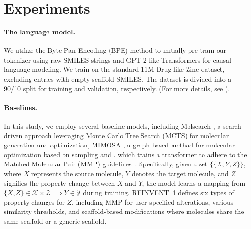 



\section{Experiments}\label{experiments}




{\paragraph{The language model.} 
We utilize the Byte Pair Encoding (BPE) method \citep{gage1994new_bpe, sennrich2015neural_bpe} to initially pre-train our tokenizer using raw SMILES strings and GPT-2-like Transformers for causal language modeling. We train on the standard 11M Drug-like Zinc dataset, excluding entries with empty scaffold SMILES. The dataset is divided into a 90/10 split for training and validation, respectively. (For more details, see ).}



{\paragraph{Baselines.} 
In this study, 
we employ several baseline models, including 
Molsearch \citep{sun2022molsearch}, a search-driven approach leveraging Monte Carlo Tree Search (MCTS) for molecular generation and optimization,  MIMOSA \citep{fu2021mimosa}, a graph-based method for molecular optimization based on sampling and . 
which trains a transformer to adhere to the Matched Molecular Pair (MMP) guidelines~\citep{tyrchan2017matched}.
Specifically, given a set $\{\{X,Y,Z\}\}$, where $X$ represents the source molecule, $Y$ denotes the target molecule, and $Z$ signifies the property change between $X$ and $Y$, the model learns a mapping from $\{X, Z\} \in \ensuremath{\mathcal{X}} \times \ensuremath{\mathcal{Z}} \implies Y \in \ensuremath{\mathcal{Y}}$ during training.
REINVENT~4 defines six types of property changes for $Z$, including MMP for user-specified alterations, various similarity thresholds, and scaffold-based modifications where molecules share the same scaffold or a generic scaffold.} 












